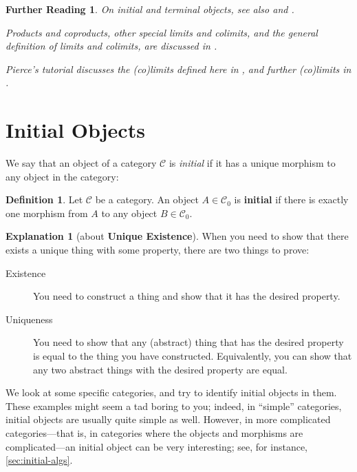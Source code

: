 \documentclass[a4paper,11pt, oneside,titlepage=false]{scrbook}
\theoremstyle{plain}
\newtheorem*{reading*}{Further Reading}
\theoremstyle{definition}
\newtheorem{dfn}[thm]{Definition}
\newtheorem{explanation}[thm]{Explanation}
\newcommand{\Cat}[1]{\mathcal{#1}}
\newcommand{\CC}{\Cat{C}}
\newcommand{\Ob}[1]{{#1}_0}
\begin{document}
\begin{reading*}
  On initial and terminal objects, see also \cite[\S 2.7.16]{barr-wells} and \cite[p. 48ff]{leinster}.

  Products and coproducts, other special limits and colimits, and the general definition of limits and colimits, are discussed in \cite[\S\S 5.1, 5.2]{leinster}.

  Pierce's tutorial discusses the (co)limits defined here in \cite[\S\S 2.3--2.4]{pierce}, and further (co)limits in  \cite[\S\S 2.5--2.7]{pierce}.

  
\end{reading*}

\section{Initial Objects}
\label{sec:initial-objects}

We say that an object of a category $\CC$ is \emph{initial} if it has a unique morphism to any object in the category:

\begin{dfn}
  Let $\CC$ be a category. An object $A \in \Ob{\CC}$ is \textbf{initial} if there is exactly one morphism from $A$ to any object $B \in \Ob{\CC}$.
\end{dfn}

\begin{explanation}[about \textbf{Unique Existence}]
  When you need to show that there exists a unique thing with some property, there are two things to prove:
  \begin{description}
  \item[Existence] You need to construct a thing and show that it has the desired property.
  \item[Uniqueness] You need to show that any (abstract) thing that has the desired property is equal to the thing you have constructed. Equivalently, you can show that any two abstract things with the desired property are equal.
  \end{description}
\end{explanation}


We look at some specific categories, and try to identify initial objects in them.
These examples might seem a tad boring to you;
indeed, in ``simple'' categories, initial objects are usually quite simple as well.
However, in more complicated categories---that is, in categories where the objects and morphisms are complicated---an initial object can be very interesting; see, for instance, \cref{sec:initial-algs}.
\end{document}
